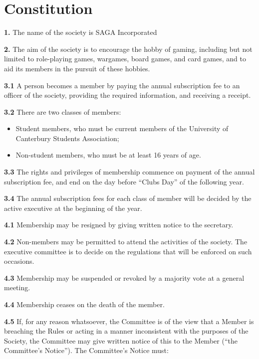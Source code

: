 \section{Constitution}
\label{sec:constitution}


\textbf{1.} The name of the society is SAGA Incorporated

\vspace{1em}

\textbf{2.} The aim of the society is to encourage the hobby of gaming, including but not limited to role-playing games, wargames, board games, and card games, and to aid its members in the pursuit of these hobbies. 

\vspace{1em}

\textbf{3.1} A person becomes a member by paying the annual subscription fee to an officer of the society, providing the required information, and receiving a receipt.

\textbf{3.2} There are two classes of members:

\begin{itemize}
  \item Student members, who must be current members of the University of Canterbury Students Association; 
  \item Non-student members, who must be at least 16 years of age. 
\end{itemize}

\textbf{3.3} The rights and privileges of membership commence on payment of the annual subscription fee, and end on the day before ``Clubs Day'' of the following year.

\textbf{3.4} The annual subscription fees for each class of member will be decided by the active executive at the beginning of the year.

\vspace{1em}

\textbf{4.1} Membership may be resigned by giving written notice to the secretary. 

\textbf{4.2} Non-members may be permitted to attend the activities of the society. The executive committee is to decide on the regulations that will be enforced on such occasions.

\textbf{4.3} Membership may be suspended or revoked by a majority vote at a general meeting.

\textbf{4.4} Membership ceases on the death of the member.

\textbf{4.5} If, for any reason whatsoever, the Committee is of the view that a Member is breaching the Rules or acting in a manner inconsistent with the purposes of the Society, the Committee may give written notice of this to the Member (``the Committee’s Notice''). The Committee’s Notice must:


